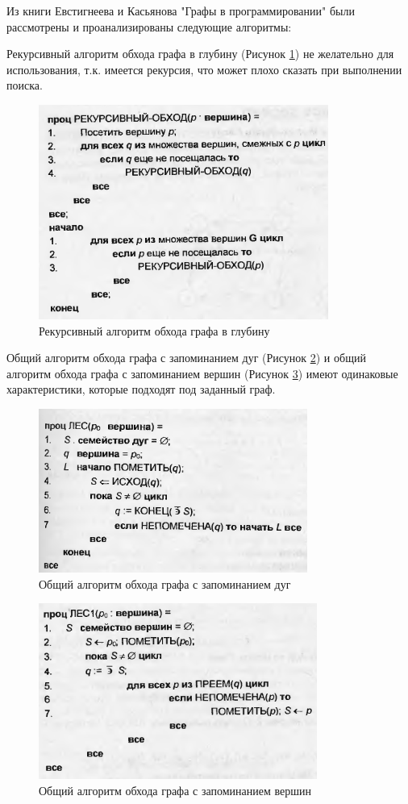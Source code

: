 \def\notedate{2023.01.10}
\def\currentauthor{Журавлев Н.В. (РК6-72Б)}

Из книги Евстигнеева и Касьянова "Графы в программировании" были рассмотрены и проанализированы следующие алгоритмы\cite{eg-graph}:

Рекурсивный алгоритм обхода графа в глубину (Рисунок \ref{fig:rec}) не желательно для использования, т.к. имеется рекурсия, что может плохо сказать при выполнении поиска.

\begin{figure}[h!]
    \centering
    \includegraphics[width=0.4\linewidth]{ResearchNotes/rndhpc_int_edt_2023_01_10/rec.png}
    \caption{Рекурсивный алгоритм обхода графа в глубину}
    \label{fig:rec}
\end{figure}

Общий алгоритм обхода графа с запоминанием дуг (Рисунок \ref{fig:save_arc}) и общий алгоритм обхода графа с запоминанием вершин (Рисунок \ref{fig:save_eages}) имеют одинаковые характеристики, которые подходят под заданный граф.

\begin{figure}[h!]
    \centering
    \includegraphics[width=0.4\linewidth]{ResearchNotes/rndhpc_int_edt_2023_01_10/save_arc.png}
    \caption{Общий алгоритм обхода графа с запоминанием дуг}
    \label{fig:save_arc}
\end{figure}

\begin{figure}[h!]
    \centering
    \includegraphics[width=0.4\linewidth]{ResearchNotes/rndhpc_int_edt_2023_01_10/save_eages.png}
    \caption{Общий алгоритм обхода графа с запоминанием вершин}
    \label{fig:save_eages}
\end{figure}

